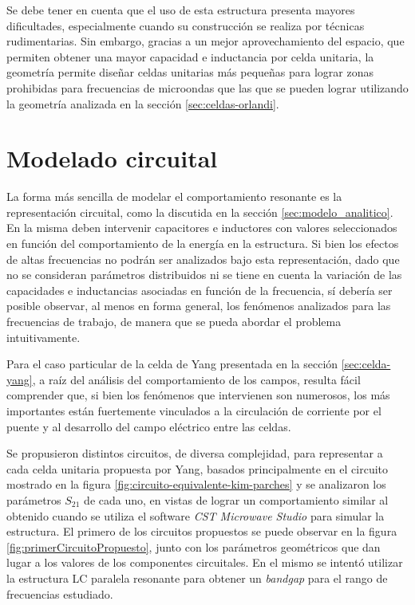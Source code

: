 Se debe tener en cuenta que el uso de esta estructura presenta mayores dificultades, especialmente cuando su construcción se realiza por técnicas rudimentarias. Sin embargo, gracias a un mejor aprovechamiento del espacio, que permiten obtener una mayor capacidad e inductancia por celda unitaria, la geometría permite diseñar celdas unitarias más pequeñas para lograr zonas prohibidas para frecuencias de microondas que las que se pueden lograr utilizando la geometría analizada en la sección \ref{sec:celdas-orlandi}.



\section{Modelado circuital}

La forma más sencilla de modelar el comportamiento resonante es la representación circuital, como la discutida en la sección \ref{sec:modelo_analitico}. En la misma deben intervenir capacitores e inductores con valores seleccionados en función del comportamiento de la energía en la estructura. Si bien los efectos de altas frecuencias no podrán ser analizados bajo esta representación, dado que no se consideran parámetros distribuidos ni se tiene en cuenta la variación de las capacidades e inductancias asociadas en función de la frecuencia, sí debería ser posible observar, al menos en forma general, los fenómenos analizados para las frecuencias de trabajo, de manera que se pueda abordar el problema intuitivamente.

Para el caso particular de la celda de Yang presentada en la sección \ref{sec:celda-yang}, a raíz del análisis del comportamiento de los campos, resulta fácil comprender que, si bien los fenómenos que intervienen son numerosos, los más importantes están fuertemente vinculados a la circulación de corriente por el puente y al desarrollo del campo eléctrico entre las celdas.

Se propusieron distintos circuitos, de diversa complejidad, para representar a cada celda unitaria propuesta por Yang, basados principalmente en el circuito mostrado en la figura \ref{fig:circuito-equivalente-kim-parches} y se analizaron los parámetros $S_{21}$ de cada uno, en vistas de lograr un comportamiento similar al obtenido cuando se utiliza el software \textit{CST Microwave Studio} para simular la estructura. El primero de los circuitos propuestos se puede observar en la figura \ref{fig:primerCircuitoPropuesto}, junto con los parámetros geométricos que dan lugar a los valores de los componentes circuitales. En el mismo se intentó utilizar la estructura LC paralela resonante para obtener un \textit{bandgap} para el rango de frecuencias estudiado.

